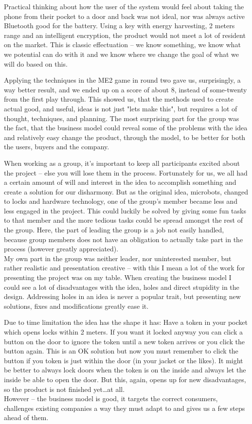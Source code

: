 \documentclass[oneside, 12pt]{article}
\begin{document}
Practical thinking about how the user of the system would feel about taking the phone from their pocket to a door and back was not ideal, nor was always active Bluetooth good for the battery.
Using a key with energy harvesting, 2 meters range and an intelligent encryption, the product would not meet a lot of resident on the market.
This is classic effectuation -- we know something, we know what we potential can do with it and we know where we change the goal of what we will do based on this.

Applying the techniques in the ME2 game in round two gave us, surprisingly, a way better result, and we ended up on a score of about 8, instead of some-twenty from the first play through.
This showed us, that the methods used to create actual good, and useful, ideas is not just "lets make this", but requires a lot of thought, techniques, and planning.
The most surprising part for the group was the fact, that the business model could reveal some of the problems with the idea and relatively easy change the product, through the model, to be better for both the users, buyers and the company.

When working as a group, it's important to keep all participants excited about the project -- else you will lose them in the process.
Fortunately for us, we all had a certain amount of will and interest in the idea to accomplish something and create a solution for our disharmony. 
But as the original idea, microbots, changed to locks and hardware technology, one of the group's member became less and less engaged in the project.
This could luckily be solved by giving some fun tasks to that member and the more tedious tasks could be spread amongst the rest of the group.
Here, the part of leading the group is a job not easily handled, because group members does not have an obligation to actually take part in the process (however greatly appreciated).
\\
My own part in the group was neither leader, nor uninterested member, but rather realistic and presentation creative -- with this I mean a lot of the work for presenting the project was on my table.
When creating the business model I could see a lot of disadvantages with the idea, holes and direct stupidity in the design.
Addressing holes in an idea is never a popular trait, but presenting new solutions, fixes and modifications greatly ease it.

Due to time limitation the idea has the shape it has: Have a token in your pocket which opens locks within 2 meters. 
If you want it locked anyway you can click a button on the door to ignore the token until a new token arrives or you click the button again.
This is an OK solution but now you must remember to click the button if you token is just within the door (in your jacket or the likes).
It might be better to always lock doors when the token is on the inside and always let the inside be able to open the door.
But this, again, opens up for new disadvantages, so the product is not finished yet\dots at all.
\\
However -- the business model is good, it targets the correct consumers, challenges existing companies a way they must adapt to and gives us a few steps ahead of them.
\end{document}
